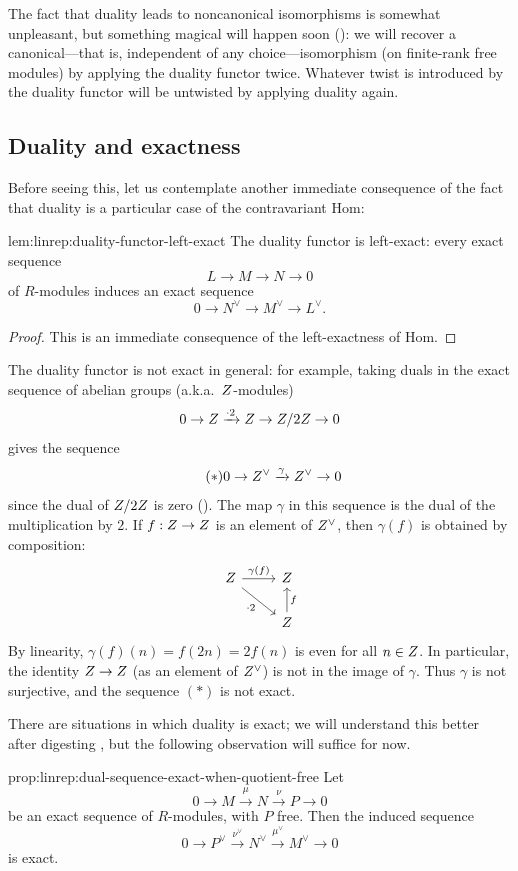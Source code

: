 The fact that duality leads to noncanonical isomorphisms is somewhat
unpleasant, but something magical will happen soon
(): we will
recover a canonical---that is, independent of any choice---isomorphism
(on finite-rank free modules) by applying the duality functor twice.
Whatever twist is introduced by the duality functor will be untwisted
by applying duality again.

\subsection{Duality and exactness}
\label{subsec:linrep:duality-and-exactness}
Before seeing this, let us contemplate another immediate consequence
of the fact that duality is a particular case of the contravariant
Hom:

\begin{lem}{}{lem:linrep:duality-functor-left-exact}
  The duality functor is left-exact: every exact sequence
  \[
    L \to M \to N \to 0
  \]
  of $R$-modules induces an exact sequence
  \[
    0 \to N^\vee \to M^\vee \to L^\vee.
  \]
\end{lem}
\begin{proof}
  This is an immediate consequence of the left-exactness of Hom.
\end{proof}

The duality functor is not exact in general: for example, taking duals
in the exact sequence of abelian groups (a.k.a.\ $Z$-modules)
\[
  0 \to Z \xrightarrow{\cdot 2} Z \to Z/2Z \to 0
\]
gives the sequence
\begin{equation}
  \tag{$*$}
  0 \to Z^\vee \xrightarrow{\gamma} Z^\vee \to 0
\end{equation}
since the dual of $Z/2Z$ is zero
(). The map $\gamma$ in this
sequence is the dual of the multiplication by $2$.  If $f : Z \to Z$
is an element of $Z^\vee$, then $\gamma(f)$ is obtained by
composition:
\[
  \begin{tikzcd}
    \Z \ar[r, "\gamma(f)"] \ar[dr, "\cdot 2"'] &
    \Z \\
    & \Z \ar[u, "f"']
  \end{tikzcd}
\]
By linearity, $\gamma(f)(n) = f(2n) = 2f(n)$ is even for all
$n \in Z$. In particular, the identity $Z \to Z$ (as an element of
$Z^\vee$) is not in the image of $\gamma$. Thus $\gamma$ is not
surjective, and the sequence $(*)$ is not exact.

There are situations in which duality is exact; we will understand
this better after digesting
,
but the following observation will suffice for now.
\begin{prop}{}{prop:linrep:dual-sequence-exact-when-quotient-free}
  Let
  \[
    0 \to M \xrightarrow{\mu} N \xrightarrow{\nu} P \to 0
  \]
  be an exact sequence of $R$-modules, with $P$ free. Then the induced
  sequence
  \[
    0 \to P^\vee \xrightarrow{\nu^\vee} N^\vee \xrightarrow{\mu^\vee}
    M^\vee \to 0
  \]
  is exact.
\end{prop}

